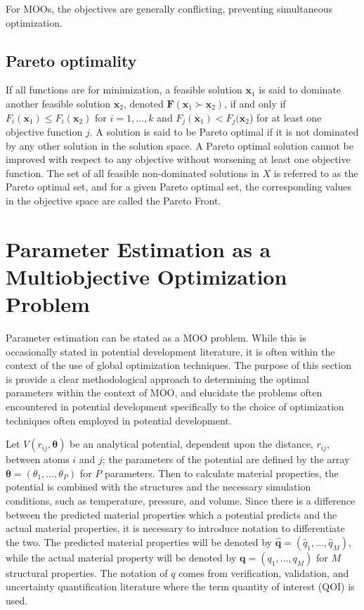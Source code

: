For MOOs, the objectives are generally conflicting, preventing simultaneous optimization.

\subsection{Pareto optimality}

If all functions are for minimization, a feasible solution $\bm{x}_1$ is said to dominate another feasible solution $\bm{x}_2$, denoted $\bm{F}(\bm{x}_1 \succ \bm{x}_2)$, if and only if $F_i(\bm{x}_1)\leq F_i(\bm{x}_2)$ for $i = 1,...,k$ and $F_j(\bm{x}_1)< F_j(\bm{x}_2$) for at least one objective function $j$.  A solution is said to be Pareto optimal if it is not dominated by any other solution in the solution space.  A Pareto optimal solution cannot be improved with respect to any objective without worsening at least one objective function.  The set of all feasible non-dominated solutions in $X$ is referred to as the Pareto optimal set, and for a given Pareto optimal set, the corresponding values in the objective space are called the Pareto Front.

\section{Parameter Estimation as a Multiobjective Optimization Problem}
Parameter estimation can be stated as a MOO problem.
While this is occasionally stated in potential development literature, it is often within the context of the use of global optimization techniques.
The purpose of this section is provide a clear methodological approach to determining the optimal parameters within the context of MOO, and elucidate the problems often encountered in potential development specifically to the choice of optimization techniques often employed in potential development.

Let $V(r_{ij},\bm{\theta})$ be an analytical potential, dependent upon the distance, $r_{ij}$, between atoms $i$ and $j$; the parameters of the potential are defined by the array $\bm{\theta}=(\theta_1,...,\theta_P)$ for $P$ parameters.
Then to calculate material properties, the potential is combined with the structures and the necessary simulation conditions, such as temperature, pressure, and volume.
Since there is a difference between the predicted material properties which a potential predicts and the actual material properties, it is necessary to introduce notation to differentiate the two.
The predicted material properties will be denoted by $\hat{\bm{q}} = (\hat{q}_1,...,\hat{q}_M)$, while the actual material property will be denoted by $\bm{q} = (q_1,...,q_M)$ for $M$ structural properties.  The notation of $q$ comes from verification, validation, and uncertainty quantification literature where the term quantity of interest (QOI) is used.

